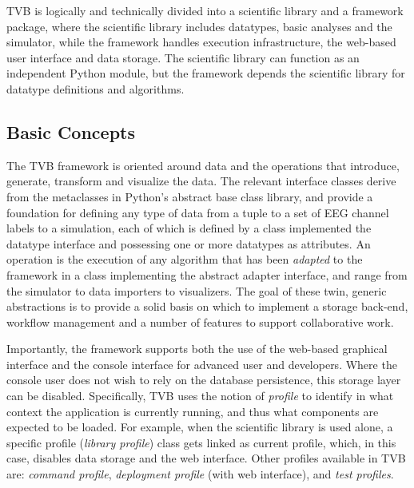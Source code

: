 TVB is logically and technically divided into a scientific
library and a framework package, where the scientific library includes
datatypes, basic analyses and the simulator, while the
framework handles execution infrastructure, the web-based user interface and
data storage.  The scientific library can function as an independent Python
module, but the framework depends the scientific library for datatype definitions
and algorithms. 

\subsection{Basic Concepts}

The TVB framework is oriented around data and the operations that introduce,
generate, transform and visualize the data. The relevant interface classes
derive from the metaclasses in Python's abstract base class library, and
provide a foundation for defining any type of data from a tuple to a
set of EEG channel labels to a simulation, each of which is defined by a class
implemented the datatype interface and possessing one or more datatypes as 
attributes. An operation is the execution of any algorithm that
has been \emph{adapted} to the framework in a class implementing the abstract
adapter interface, and range from the simulator to data importers to
visualizers.  The goal of these twin, generic abstractions is to provide a
solid basis on which to implement a storage back-end, workflow management and a
number of features to support collaborative work. 

Importantly, the framework supports both the use of the web-based graphical
interface and the console interface for advanced user and developers. Where
the console user does not wish to rely on the database persistence, this 
storage layer can be disabled. Specifically, TVB uses the notion of \emph{profile} to 
identify in what context the application is currently running,
and thus what components are expected to be loaded.
For example, when the scientific library is used alone, a specific profile (\emph{library profile}) class 
gets linked as current profile, which, in this case, disables data storage and the web interface. Other profiles available
in TVB are: \emph{command profile}, \emph{deployment profile} (with web interface), and \emph{test profiles}.


